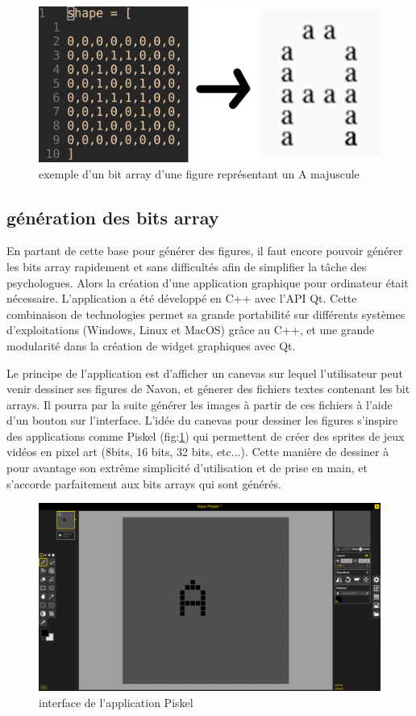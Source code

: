 \documentclass{article}
\begin{document}
	\begin{figure}[!h]
		\centering
		\includegraphics[scale=0.9]{./images/txt_to_image.png}
		\caption{exemple d'un bit array d'une figure représentant un A majuscule}
	\end{figure}

	\subsection{génération des bits array}

En partant de cette base pour générer des figures, il faut encore pouvoir générer les bits array rapidement et sans difficultés afin de simplifier la tâche des psychologues. Alors la création d'une application graphique pour ordinateur était nécessaire. L'application a été développé en C++ avec l'API Qt. Cette combinaison de technologies permet sa grande portabilité sur différents systèmes d'exploitations (Windows, Linux et MacOS) grâce au C++, et une grande modularité dans la création de widget graphiques avec Qt. 

Le principe de l'application est d'afficher un canevas sur lequel l'utilisateur peut venir dessiner ses figures de Navon, et génerer des fichiers textes contenant les bit arrays. Il pourra par la suite générer les images à partir de ces fichiers à l'aide d'un bouton sur l'interface. 
	L'idée du canevas pour dessiner les figures s'inspire des applications comme Piskel (fig:\ref{fig:Piskel}) qui permettent de créer des sprites de jeux vidéos en pixel art (8bits, 16 bits, 32 bits, etc...). Cette manière de dessiner à pour avantage son extrême simplicité d'utilisation et de prise en main, et s'accorde parfaitement aux bits arrays qui sont générés.

	\begin{figure}[!h]
		\centering
		\includegraphics[scale=0.2]{./images/piskel.png}
		\caption{interface de l'application Piskel}
		\label{fig:Piskel}
	\end{figure}
\end{document}
